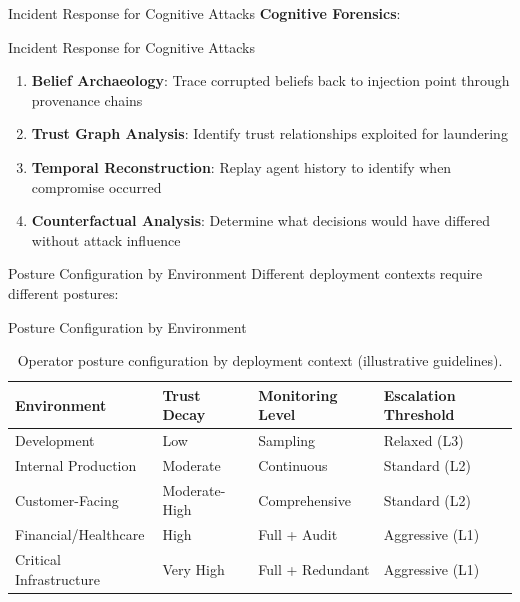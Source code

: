 \documentclass[
  ignorenonframetext,
]{beamer}
\begin{document}
\begin{frame}[allowframebreaks]{Incident Response for Cognitive Attacks}
\textbf{Cognitive Forensics}:

\end{frame}

\begin{frame}[allowframebreaks]{Incident Response for Cognitive Attacks}
\begin{enumerate}
\item \textbf{Belief Archaeology}: Trace corrupted beliefs back to injection point through provenance chains
\item \textbf{Trust Graph Analysis}: Identify trust relationships exploited for laundering
\item \textbf{Temporal Reconstruction}: Replay agent history to identify when compromise occurred
\item \textbf{Counterfactual Analysis}: Determine what decisions would have differed without attack influence
\end{enumerate}
\end{frame}

\begin{frame}[allowframebreaks]{Posture Configuration by Environment}
\protect{}\label{posture-configuration-by-environment}
Different deployment contexts require different postures:

\end{frame}

\begin{frame}[allowframebreaks]{Posture Configuration by Environment}
\begin{table}[htbp]
\centering
\caption{Operator posture configuration by deployment context (illustrative guidelines).}
\label{tab:posture-config}
\begin{tabular}{@{}llll@{}}
\toprule
Environment & Trust Decay & Monitoring Level & Escalation Threshold \\
\midrule
Development & Low & Sampling & Relaxed (L3) \\
Internal Production & Moderate & Continuous & Standard (L2) \\
Customer-Facing & Moderate-High & Comprehensive & Standard (L2) \\
Financial/Healthcare & High & Full + Audit & Aggressive (L1) \\
Critical Infrastructure & Very High & Full + Redundant & Aggressive (L1) \\
\bottomrule
\end{tabular}
\end{table}

\end{frame}
\end{document}
